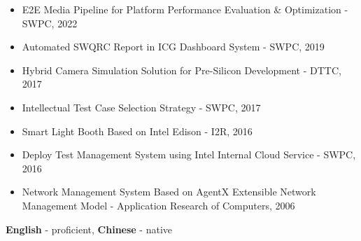 \documentclass[9pt]{developercv} %
\begin{document}
\begin{itemize}
\vspace{-10pt}
    \item E2E Media Pipeline for Platform Performance Evaluation \& Optimization - SWPC, 2022
    \item Automated SWQRC Report in ICG Dashboard System - SWPC, 2019
    \item Hybrid Camera Simulation Solution for Pre-Silicon Development - DTTC, 2017
    \item Intellectual Test Case Selection Strategy - SWPC, 2017
    \item Smart Light Booth Based on Intel Edison - I2R, 2016
    \item Deploy Test Management System using Intel Internal Cloud Service - SWPC, 2016
    \item Network Management System Based on AgentX Extensible Network Management Model - Application Research of Computers, 2006
\end{itemize}

\vspace{10pt}

\vspace{-10 pt}
    \vspace{-6pt}
    
    \hspace{22mm} \textbf{English} - proficient, \textbf{Chinese} - native

\end{document}

